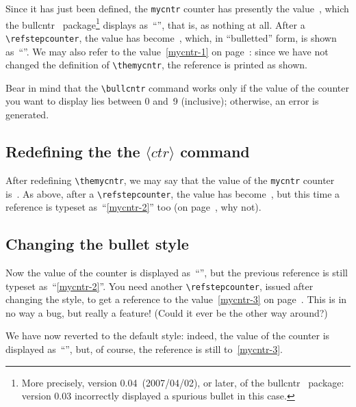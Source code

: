 \documentclass[a4paper]{article}
\DeclareRobustCommand*{\command}[1]{%
	{\texorpdfstring{\normalfont\ttfamily \char\escapechar}{\pdfbslash}#1}%
}
\DeclareRobustCommand*{\packlass}[1]{%
	{\texorpdfstring{\normalfont \sffamily}{}#1}%
}
\DeclareRobustCommand*{\meta}[1]{%
	\texorpdfstring
		{\mbox{\normalfont \(\langle\textit{#1}\rangle\)}}%
		{<#1>}%
}
\DeclareRobustCommand*{\cnt}[1]{\texttt{#1}}
\newcommand*{\Bullcntr}{bullcntr}
\newcommand*{\bull}{\packlass{\Bullcntr}}
\newcommand*{\tbull}{the \bull\ package}
\newcommand*{\pdfbslash}{}
{\catcode`\|=0 |catcode`|\=12 |gdef|pdfbslash{\\}}
\begin{document}
Since it has just been defined, the \cnt{mycntr} counter has presently
the value~, which \tbull\footnote{More precisely,
version 0.04\ (2007/04/02), or later, of \tbull: version 0.03
incorrectly displayed a spurious bullet in this case.} displays
as~``'', that is, as nothing at all.
\label{mycntr-1}After a \verb|\refstepcounter|,
the value has become~, which, in ``bulletted'' form, is
shown as~``''.  We may also refer to the
value~\ref{mycntr-1} on page~\pageref{mycntr-1}: since we have not
changed the definition of \verb|\themycntr|, the reference is printed
as shown.

Bear in mind that the \verb|\bullcntr| command works only if the value
of the counter you want to display lies between 0 and~9 (inclusive);
otherwise, an error is generated.



\subsection{Redefining the \command{the}\meta{ctr} command}

\renewcommand*{\themycntr}{\bullcntr{mycntr}}

After redefining \verb|\themycntr|, we may say that the value of the
\cnt{mycntr} counter is~\themycntr.
\label{mycntr-2}As above, after a
\verb|\refstepcounter|, the value has become~\themycntr, but this time
a reference is typeset as~``\ref{mycntr-2}'' too (on
page~\pageref{mycntr-2}, why not).



\subsection{Changing the bullet style}

\heartctrbull

Now the value of the counter is displayed as~``\themycntr'', but the
previous reference is still typeset as~``\ref{mycntr-2}''.
\label{mycntr-3}You need another
\verb|\refstepcounter|, issued after changing the style, to get a
reference to the value~\ref{mycntr-3} on page~\pageref{mycntr-3}.
This is in no way a bug, but really a feature!  (Could it ever be the
other way around?)

\smartctrbull

We have now reverted to the default style: indeed, the value of the
counter is displayed as~``\themycntr'', but, of course, the reference
is still to~\ref{mycntr-3}.
\end{document}
